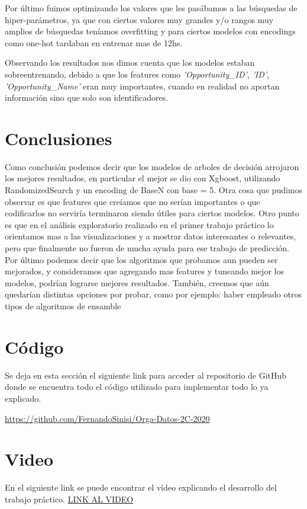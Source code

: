 \documentclass[12pt,a4paper]{article}
\begin{document}
Por último fuimos optimizando los valores que les pasábamos a las búsquedas de hiper-parámetros, ya que con ciertos valores muy grandes y/o rangos muy amplios de búsquedas teníamos overfitting y para ciertos modelos con encodings como one-hot tardaban en entrenar mas de 12hs.


Observando los resultados nos dimos cuenta que los modelos estaban sobreentrenando, debido a que los features como \textit{'Opportunity\_ID'}, \textit{'ID'}, \textit{'Opportunity\_Name'} eran muy importantes, cuando en realidad no aportan información sino que solo son identificadores.

\section{Conclusiones}

Como conclusión podemos decir que los modelos de arboles de decisión arrojaron los mejores resultados, en particular el mejor se dio con Xgboost, utilizando RandomizedSearch y un encoding de BaseN con base = 5.
Otra cosa que pudimos observar es que features que creíamos que no serían importantes o que codificarlos no serviría terminaron siendo útiles para ciertos modelos. \newline
Otro punto es que en el análisis exploratorio realizado en el primer trabajo práctico lo orientamos mas a las visualizaciones y a mostrar datos interesantes o relevantes, pero que finalmente no fueron de mucha ayuda para ese trabajo de predicción. \newline
Por último podemos decir que los algoritmos que probamos aun pueden ser mejorados, y consideramos que agregando mas features y tuneando mejor los modelos, podrían lograrse mejores resultados. También, creemos que aún quedarían distintas opciones por probar, como por ejemplo: haber empleado otros tipos de algoritmos de ensamble

\section{Código}

Se deja en esta sección el siguiente link para acceder al repositorio de GitHub donde se encuentra todo el código utilizado para implementar todo lo ya explicado.

\url{https://github.com/FernandoSinisi/Orga-Datos-2C-2020}

\section{Video}

En el siguiente link se puede encontrar el vídeo explicando el desarrollo del trabajo práctico.
\url{LINK AL VIDEO}
\end{document}
